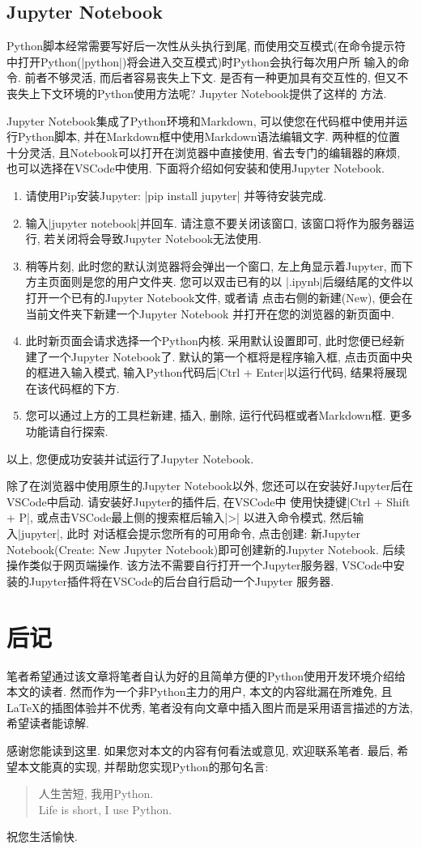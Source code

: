 \documentclass[11pt]{article}
\begin{document}
\subsection{Jupyter Notebook}
Python脚本经常需要写好后一次性从头执行到尾, 而使用交互模式(在命令提示符中打开Python(\cverb|python|)将会进入交互模式)时Python会执行每次用户所
输入的命令. 前者不够灵活, 而后者容易丧失上下文. 是否有一种更加具有交互性的, 但又不丧失上下文环境的Python使用方法呢? Jupyter Notebook提供了这样的
方法.

Jupyter Notebook集成了Python环境和Markdown, 可以使您在代码框中使用并运行Python脚本, 并在Markdown框中使用Markdown语法编辑文字. 两种框的位置
十分灵活, 且Notebook可以打开在浏览器中直接使用, 省去专门的编辑器的麻烦, 也可以选择在VSCode中使用. 下面将介绍如何安装和使用Jupyter Notebook.
\begin{enumerate}
    \item 请使用Pip安装Jupyter: \cverb|pip install jupyter| 并等待安装完成.
    \item 输入\cverb|jupyter notebook|并回车. 请注意不要关闭该窗口, 该窗口将作为服务器运行, 若关闭将会导致Jupyter Notebook无法使用.
    \item 稍等片刻, 此时您的默认浏览器将会弹出一个窗口, 左上角显示着Jupyter, 而下方主页面则是您的用户文件夹. 您可以双击已有的以
    \cverb|.ipynb|后缀结尾的文件以打开一个已有的Jupyter Notebook文件, 或者请
    点击右侧的{\sffamily{}新建(New)}, 便会在当前文件夹下新建一个Jupyter Notebook 并打开在您的浏览器的新页面中.
    \item 此时新页面会请求选择一个Python内核. 采用默认设置即可, 此时您便已经新建了一个Jupyter Notebook了. 默认的第一个框将是程序输入框, 
    点击页面中央的框进入输入模式, 输入Python代码后\cverb|Ctrl + Enter|以运行代码, 结果将展现在该代码框的下方.
    \item 您可以通过上方的工具栏新建, 插入, 删除, 运行代码框或者Markdown框. 更多功能请自行探索.
\end{enumerate}
以上, 您便成功安装并试运行了Jupyter Notebook.

除了在浏览器中使用原生的Jupyter Notebook以外, 您还可以在安装好Jupyter后在VSCode中启动. 请安装好Jupyter的插件后, 在VSCode中
使用快捷键\cverb|Ctrl + Shift + P|, 或点击VSCode最上侧的搜索框后输入\cverb|>| 以进入命令模式, 然后输入\cverb|jupyter|, 此时
对话框会提示您所有的可用命令, 点击{\sffamily{}创建: 新Jupyter Notebook(Create: New Jupyter Notebook)}即可创建新的Jupyter
Notebook. 后续操作类似于网页端操作. 该方法不需要自行打开一个Jupyter服务器, VSCode中安装的Jupyter插件将在VSCode的后台自行启动一个Jupyter
服务器.

\section{后记}
笔者希望通过该文章将笔者自认为好的且简单方便的Python使用开发环境介绍给本文的读者. 然而作为一个非Python主力的用户, 本文的内容纰漏在所难免, 
且\LaTeX{}的插图体验并不优秀, 笔者没有向文章中插入图片而是采用语言描述的方法, 希望读者能谅解.

感谢您能读到这里. 如果您对本文的内容有何看法或意见, 欢迎联系笔者. 最后, 希望本文能真的实现, 并帮助您实现Python的那句名言: 
\begin{quote}
人生苦短, 我用Python. \\
Life is short, I use Python.
\end{quote}
祝您生活愉快.
\end{document}
